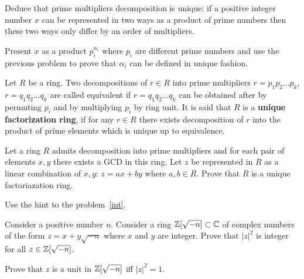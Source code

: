 \documentclass[12pt]{article}
\begin{document}
\begin{zadacha}[!] \label{int} Deduce that prime multipliers decomposition is
  unique: if a positive integer number  $x$ can be represented in two
  ways as a product of prime numbers then these two ways only differ
  by an order of multipliers.
\end{zadacha}

\begin{ukazanie} Present $x$ as a product
$p_i^{\alpha_i}$ where $p_i$ are different prime numbers and use the
  previous problem to prove that $\alpha_i$ can be defined in unique
  fashion.
\end{ukazanie}


\begin{opredelenie}
  Let $R$ be a ring. Two decompositions of $r\in R$ into prime
  multipliers $r = p_1 p_2 \ldots p_k$, $r = q_1 q_2 \ldots q_k$ are
  called equivalent if $r = q_1 q_2 \ldots q_k$ can be obtained after
  by permuting $p_i$ and by multiplying $p_i$ by ring unit.  It is
  said that $R$ is a {\bf unique factorization ring}, if for any $r\in
  R$ there exists decomposition of $r$ into the product of prime
  elements which is unique up to equivalence.
\end{opredelenie}

\begin{zadacha}[!] Let a ring $R$ admits decomposition into prime
multipliers and for each pair of elements $x, y$ there exists a GCD in
this ring. Let $z$ be represented in $R$ as a linear combination of
$x, y$: $z = ax + by$ where $a,b \in R$. Prove that $R$ is a unique
factoriazation ring.
\end{zadacha}

\begin{ukazanie} Use the hint to the problem~\ref{int}.
\end{ukazanie}

\begin{zadacha} Consider a positive number $n$. Consider a ring
${\mathbb Z}[\sqrt{-n}] \subset {\mathbb C}$ of complex numbers of the form $z= x + y
\sqrt{-n}$ where $x$ and $y$ are integer. Prove that $|z|^2$ is
integer for all $z\in {\mathbb Z}[\sqrt{-n}]$.
\end{zadacha}

\begin{zadacha} Prove that $z$ is a unit in ${\mathbb Z}[\sqrt{-n}]$
iff $|z|^2=1$.
\end{zadacha}
\end{document}

